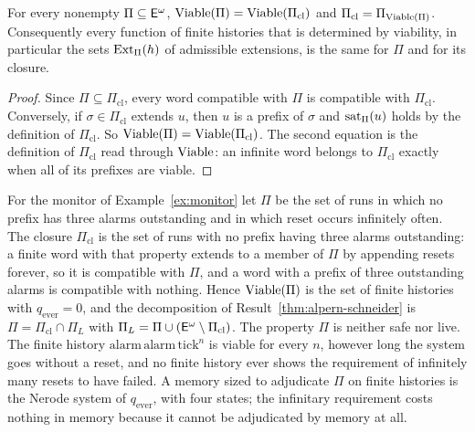 \begin{newresult}\label{prop:closure-view}
For every nonempty $\Pi\subseteq\mathsf{E}^{\omega}$, $\operatorname{Viable}(\Pi)=\operatorname{Viable}(\Pi_{\mathrm{cl}})$ and $\Pi_{\mathrm{cl}}=\Pi_{\operatorname{Viable}(\Pi)}$. Consequently every function of finite histories that is determined by viability, in particular the sets $\operatorname{Ext}_\Pi(h)$ of admissible extensions, is the same for $\Pi$ and for its closure.
\end{newresult}
\begin{proof}
Since $\Pi\subseteq\Pi_{\mathrm{cl}}$, every word compatible with $\Pi$ is compatible with $\Pi_{\mathrm{cl}}$. Conversely, if $\sigma\in\Pi_{\mathrm{cl}}$ extends $u$, then $u$ is a prefix of $\sigma$ and $\operatorname{sat}_\Pi(u)$ holds by the definition of $\Pi_{\mathrm{cl}}$. So $\operatorname{Viable}(\Pi)=\operatorname{Viable}(\Pi_{\mathrm{cl}})$. The second equation is the definition of $\Pi_{\mathrm{cl}}$ read through $\operatorname{Viable}$: an infinite word belongs to $\Pi_{\mathrm{cl}}$ exactly when all of its prefixes are viable.
\end{proof}

\begin{example}\label{ex:live-component}
For the monitor of Example~\ref{ex:monitor} let $\Pi$ be the set of runs in which no prefix has three alarms outstanding and in which $\mathrm{reset}$ occurs infinitely often. The closure $\Pi_{\mathrm{cl}}$ is the set of runs with no prefix having three alarms outstanding: a finite word with that property extends to a member of $\Pi$ by appending resets forever, so it is compatible with $\Pi$, and a word with a prefix of three outstanding alarms is compatible with nothing. Hence $\operatorname{Viable}(\Pi)$ is the set of finite histories with $q_{\mathrm{ever}}=0$, and the decomposition of Result~\ref{thm:alpern-schneider} is $\Pi=\Pi_{\mathrm{cl}}\cap\Pi_L$ with $\Pi_L=\Pi\cup(\mathsf{E}^{\omega}\setminus\Pi_{\mathrm{cl}})$. The property $\Pi$ is neither safe nor live. The finite history $\mathrm{alarm}\,\mathrm{alarm}\,\mathrm{tick}^{n}$ is viable for every $n$, however long the system goes without a reset, and no finite history ever shows the requirement of infinitely many resets to have failed. A memory sized to adjudicate $\Pi$ on finite histories is the Nerode system of $q_{\mathrm{ever}}$, with four states; the infinitary requirement costs nothing in memory because it cannot be adjudicated by memory at all.
\end{example}

